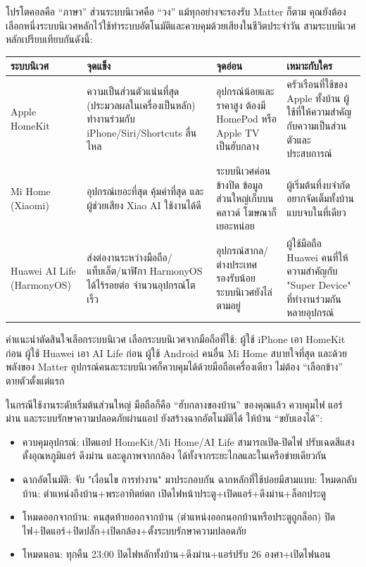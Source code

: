 
โปรโตคอลคือ “ภาษา” ส่วนระบบนิเวศคือ “วง” แม้ทุกอย่างจะรองรับ Matter ก็ตาม คุณยังต้องเลือกหนึ่งระบบนิเวศหลักไว้ใช้ทำระบบอัตโนมัติและควบคุมด้วยเสียงในชีวิตประจำวัน สามระบบนิเวศหลักเปรียบเทียบกันดังนี้:

\begin{center}
\begin{tabularx}{\linewidth}{|X|X|X|X|}
\hline
\textbf{ระบบนิเวศ} & \textbf{จุดแข็ง} & \textbf{จุดอ่อน} & \textbf{เหมาะกับใคร} \tabularnewline
\hline
Apple HomeKit & ความเป็นส่วนตัวแน่นที่สุด (ประมวลผลในเครื่องเป็นหลัก) ทำงานร่วมกับ iPhone/Siri/Shortcuts ลื่นไหล & อุปกรณ์น้อยและราคาสูง ต้องมี HomePod หรือ Apple TV เป็นฮับกลาง & ครัวเรือนที่ใช้ของ Apple ทั้งบ้าน ผู้ใช้ที่ให้ความสำคัญกับความเป็นส่วนตัวและประสบการณ์ \tabularnewline
Mi Home (Xiaomi) & อุปกรณ์เยอะที่สุด คุ้มค่าที่สุด และผู้ช่วยเสียง Xiao AI ใช้งานได้ดี & ระบบนิเวศค่อนข้างปิด ข้อมูลส่วนใหญ่เก็บบนคลาวด์ โฆษณาก็เยอะหน่อย & ผู้เริ่มต้นที่งบจำกัด อยากจัดเต็มทั้งบ้านแบบจบในที่เดียว \tabularnewline
Huawei AI Life (HarmonyOS) & ส่งต่องานระหว่างมือถือ/แท็บเล็ต/นาฬิกา HarmonyOS ได้ไร้รอยต่อ จำนวนอุปกรณ์โตเร็ว & อุปกรณ์สากล/ต่างประเทศรองรับน้อย ระบบนิเวศยังไล่ตามอยู่ & ผู้ใช้มือถือ Huawei คนที่ให้ความสำคัญกับ "Super Device" ที่ทำงานร่วมกันหลายอุปกรณ์ \tabularnewline
\hline
\end{tabularx}
\end{center}

\begin{tcbinfo}{คำแนะนำตัดสินใจเลือกระบบนิเวศ}
เลือกระบบนิเวศจากมือถือที่ใช้: ผู้ใช้ iPhone เอา HomeKit ก่อน ผู้ใช้ Huawei เอา AI Life ก่อน ผู้ใช้ Android คนอื่น Mi Home สบายใจที่สุด และด้วยพลังของ Matter อุปกรณ์คนละระบบนิเวศก็ควบคุมได้ด้วยมือถือเครื่องเดียว ไม่ต้อง “เลือกข้าง” ตายตัวตั้งแต่แรก

\end{tcbinfo}


ในกรณีใช้งานระดับเริ่มต้นส่วนใหญ่ มือถือก็คือ “ฮับกลางของบ้าน” ของคุณแล้ว ควบคุมไฟ แอร์ ม่าน และระบบรักษาความปลอดภัยผ่านแอป ยังสร้างฉากอัตโนมัติได้ ให้บ้าน “ขยับเองได้”:

\begin{itemize}
  \item ควบคุมอุปกรณ์: เปิดแอป HomeKit/Mi Home/AI Life สามารถเปิด-ปิดไฟ ปรับเฉดสีแสง ตั้งอุณหภูมิแอร์ ดึงม่าน และดูภาพจากกล้อง ได้ทั้งจากระยะไกลและในเครือข่ายเดียวกัน
  \item ฉากอัตโนมัติ: จับ "เงื่อนไข การทำงาน" มาประกอบกัน ฉากหลักที่ใช้บ่อยมีสามแบบ: โหมดกลับบ้าน: ตำแหน่งถึงบ้าน+พระอาทิตย์ตก เปิดไฟหน้าประตู+เปิดแอร์+ดึงม่าน+ล็อกประตู
  \item โหมดออกจากบ้าน: คนสุดท้ายออกจากบ้าน (ตำแหน่งออกนอกบ้านหรือประตูถูกล็อก) ปิดไฟ+ปิดแอร์+ปิดปลั๊ก+เปิดกล้อง+ตั้งระบบรักษาความปลอดภัย
  \item โหมดนอน: ทุกคืน 23:00 ปิดไฟหลักทั้งบ้าน+ดึงม่าน+แอร์ปรับ 26 องศา+เปิดไฟนอน
\end{itemize}

